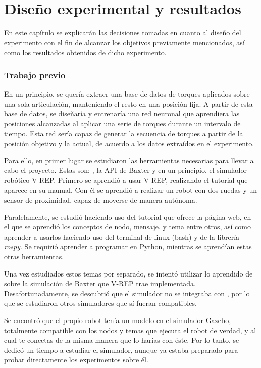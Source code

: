\chapter{Diseño experimental y resultados}
En este capítulo se explicarán las decisiones tomadas en cuanto al diseño del experimento con el fin de alcanzar los objetivos previamente mencionados, así como los resultados obtenidos de dicho experimento.
\subsection{Trabajo previo}
En un principio, se quería extraer una base de datos de torques aplicados sobre una sola articulación, manteniendo el resto en una posición fija. A partir de esta base de datos, se diseñaría y entrenaría una red neuronal que aprendiera las posiciones alcanzadas al aplicar una serie de torques durante un intervalo de tiempo. Esta red sería capaz de generar la secuencia de torques a partir de la posición objetivo y la actual, de acuerdo a los datos extraídos en el experimento.

Para ello, en primer lugar se estudiaron las herramientas necesarias para llevar a cabo el proyecto. Estas son: \ros, la API de Baxter y en un principio, el simulador robótico V-REP. Primero se aprendió a usar V-REP, realizando el tutorial que aparece en su manual. Con él se aprendió a realizar un robot con dos ruedas y un sensor de proximidad, capaz de moverse de manera autónoma.

Paralelamente, se estudió \ros haciendo uso del tutorial que ofrece la página web, en el que se aprendió los conceptos de nodo, mensaje, y tema entre otros, así como aprender a usarlos haciendo uso del terminal de linux (bash) y de la librería \textit{rospy}. Se requirió aprender a programar en Python, mientras se aprendían estas otras herramientas.

Una vez estudiados estos temas por separado, se intentó utilizar lo aprendido de \ros sobre la simulación de Baxter que V-REP trae implementada. Desafortunadamente, se descubrió que el simulador no se integraba con \ros, por lo que se estudiaron otros simuladores que sí fueran compatibles.

Se encontró que el propio robot tenía un modelo en el simulador Gazebo, totalmente compatible con los nodos y temas que ejecuta el robot de verdad, y al cual te conectas de la misma manera que lo harías con éste. Por lo tanto, se dedicó un tiempo a estudiar el simulador, aunque ya estaba preparado para probar directamente los experimentos sobre él.

